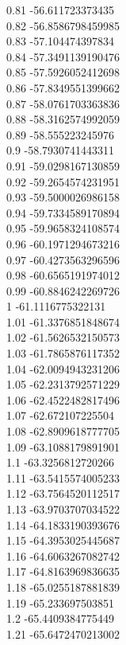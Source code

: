 {0.81	-56.611723373435\\
0.82	-56.8586798459985\\
0.83	-57.104474397834\\
0.84	-57.3491139190476\\
0.85	-57.5926052412698\\
0.86	-57.8349551399662\\
0.87	-58.0761703363836\\
0.88	-58.3162574992059\\
0.89	-58.555223245976\\
0.9	-58.7930741443311\\
0.91	-59.0298167130859\\
0.92	-59.2654574231951\\
0.93	-59.5000026986158\\
0.94	-59.7334589170894\\
0.95	-59.9658324108574\\
0.96	-60.1971294673216\\
0.97	-60.4273563296596\\
0.98	-60.6565191974012\\
0.99	-60.8846242269726\\
1	-61.1116775322131\\
1.01	-61.3376851848674\\
1.02	-61.5626532150573\\
1.03	-61.7865876117352\\
1.04	-62.0094943231206\\
1.05	-62.2313792571229\\
1.06	-62.4522482817496\\
1.07	-62.672107225504\\
1.08	-62.8909618777705\\
1.09	-63.1088179891901\\
1.1	-63.3256812720266\\
1.11	-63.5415574005233\\
1.12	-63.7564520112517\\
1.13	-63.9703707034522\\
1.14	-64.1833190393676\\
1.15	-64.3953025445687\\
1.16	-64.6063267082742\\
1.17	-64.8163969836635\\
1.18	-65.0255187881839\\
1.19	-65.233697503851\\
1.2	-65.4409384775449\\
1.21	-65.6472470213002\\
}
